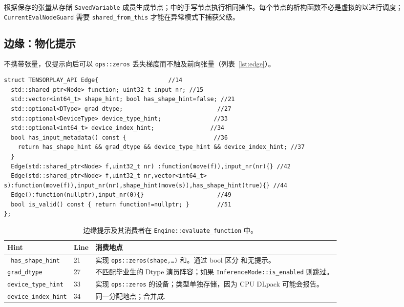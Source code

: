 根据保存的张量从存储 \texttt{SavedVariable} 成员生成节点；中的手写节点执行相同操作。每个节点的析构函数不必是虚拟的以进行调度； \texttt{CurrentEvalNodeGuard} 需要 \texttt{shared\_from\_this} 才能在异常模式下捕获父级。

\subsection{边缘：物化提示}
\label{subsec:edge}

不携带张量，仅提示向后可以 \texttt{ops::zeros} 丢失梯度而不触及前向张量（列表~\ref{lst:edge}）。

\begin{lstlisting}[caption={hints.}, label=lst:edge]
struct TENSORPLAY_API Edge{                    //14
  std::shared_ptr<Node> function; uint32_t input_nr; //15
  std::vector<int64_t> shape_hint; bool has_shape_hint=false; //21
  std::optional<DType> grad_dtype;                           //27
  std::optional<DeviceType> device_type_hint;               //33
  std::optional<int64_t> device_index_hint;                //34
  bool has_input_metadata() const {                         //36
    return has_shape_hint && grad_dtype && device_type_hint && device_index_hint; //37
  }
  Edge(std::shared_ptr<Node> f,uint32_t nr) :function(move(f)),input_nr(nr){} //42
  Edge(std::shared_ptr<Node> f,uint32_t nr,vector<int64_t> s):function(move(f)),input_nr(nr),shape_hint(move(s)),has_shape_hint(true){} //44
  Edge():function(nullptr),input_nr(0){}                     //49
  bool is_valid() const { return function!=nullptr; }        //51
};
\end{lstlisting}

\begin{table}[H]
\centering
\caption{边缘提示及其消费者在 \texttt{Engine::evaluate\_function} 中。}
\label{tab:edgehints}
\small
\begin{tabular}{lll}
\toprule
Hint & Line & 消费地点 \\
\midrule
\texttt{ has\_shape\_hint} & 21 & 实现 \texttt{ops::zeros(shape,\dots)} 和。通过 bool 区分 \texttt{} 和无提示。 \\
\texttt{grad\_dtype} & 27 & 不匹配毕业生的 Dtype 演员阵容；如果 \texttt{InferenceMode::is\_enabled} 则跳过。 \\
\texttt{device\_type\_hint} & 33 & 实现 \texttt{ops::zeros} 的设备；类型单独存储，因为 CPU DLpack 可能会报告。 \\
\texttt{device\_index\_hint} & 34 & 同一分配地点；合并成. \\
\bottomrule
\end{tabular}
\end{table}

